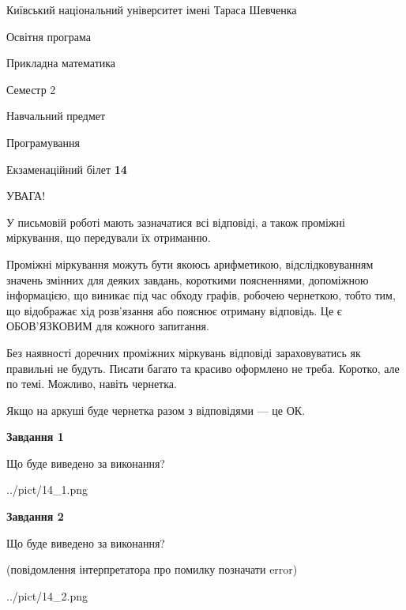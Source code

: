 \documentclass[12pt, ukrainian]{article}
\begin{document}
{{\begin {small}\par
{ \center  Київський національний університет імені Тараса Шевченка \par}
{\parbox {5 cm}{Освітня програма \hfill}{\parbox {7 cm}{Прикладна математика\hfill}}\parbox {6 cm}{\hfill Семестр 2}}\par
{\parbox {5 cm} {Навчальний предмет \hfill}\parbox {7 cm}{Програмування \hfill}\parbox {6cm}{\hfill}\par}\vspace{-7pt} \end{small}}{\center Екзаменаційний білет \No \textbf
{ 14 }\par}}
{
\begin {large}
УВАГА!

У письмовій роботі мають зазначатися всі відповіді, а також проміжні міркування, що передували їх отриманню.

Проміжні міркування можуть бути якоюсь арифметикою, відслідковуванням зна\-чень змінних для деяких завдань,
короткими поясненнями, допоміжною інформацією, що виникає під час обходу графів, робочею чернеткою,
тобто тим, що відображає хід розв’язання або пояснює отриману відповідь.
Це є ОБОВ’ЯЗКОВИМ для кожного запитання.

Без наявності доречних проміжних міркувань відповіді зараховуватись як правиль\-ні не будуть.
Писати багато та красиво оформлено не треба. Коротко, але по темі. Можли\-во, навіть чернетка.

Якщо на аркуші буде чернетка разом з відповідями --- це ОК.

\newpage

{\begin {center}\textbf{Завдання 1}\end {center}}\par
Що буде виведено за виконання?\par
\begin{center}
	{../pict/14_1.png}
\end{center}
\newpage

{\begin {center}\textbf{Завдання 2}\end {center}}\par
Що буде виведено за виконання?\par
 (повідомлення інтерпретатора про помилку позначати error)\par
\begin{center}
	{../pict/14_2.png}
\end{center}
\newpage


\end{large}}
\end{document}
